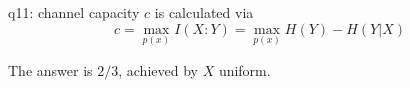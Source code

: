 \documentclass[a4paper]{article}
\begin{document}
                                                                                                                                                                                                                                                                                                                                                                                                                                                                                                                                                                                                                                                                                                                                                                                                                                                                                                                                                                                                                                                                                                                                                                                                                                                                                                                                                     q11: channel capacity $c$ is calculated via
                                                                                                                                                                                                                                                                                                                                                                                                                                                                                                                                                                                                                                                                                                                                                                                                                                                                                                                                                                                                                                                                                                                                                                                                                                                                                                                                                   \[
c=\max_{p(x)} I(X:Y) = \max_{p(x)} H(Y)-H(Y|X)
\]

The answer is $2/3$, achieved by $X$ uniform.
\end{document}
